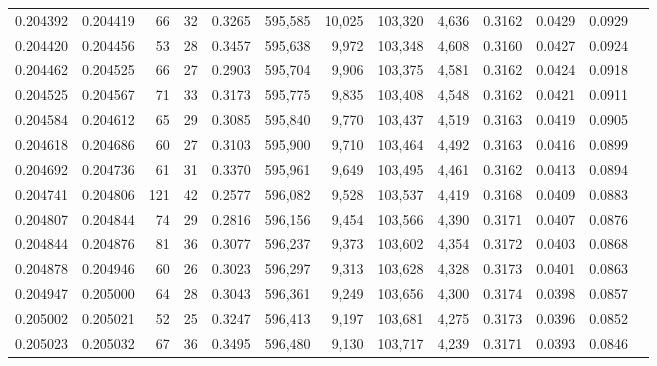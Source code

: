 \begin{tabular}{rrrrrrrrrrrrr}
0.204392 & 0.204419 &    66 &  32 &                                     0.3265 & 595,585 &  10,025 & 103,320 &   4,636 & 0.3162 & 0.0429 & 0.0929 \\
0.204420 & 0.204456 &    53 &  28 &                                     0.3457 & 595,638 &   9,972 & 103,348 &   4,608 & 0.3160 & 0.0427 & 0.0924 \\
0.204462 & 0.204525 &    66 &  27 &                                     0.2903 & 595,704 &   9,906 & 103,375 &   4,581 & 0.3162 & 0.0424 & 0.0918 \\
0.204525 & 0.204567 &    71 &  33 &                                     0.3173 & 595,775 &   9,835 & 103,408 &   4,548 & 0.3162 & 0.0421 & 0.0911 \\
0.204584 & 0.204612 &    65 &  29 &                                     0.3085 & 595,840 &   9,770 & 103,437 &   4,519 & 0.3163 & 0.0419 & 0.0905 \\
0.204618 & 0.204686 &    60 &  27 &                                     0.3103 & 595,900 &   9,710 & 103,464 &   4,492 & 0.3163 & 0.0416 & 0.0899 \\
0.204692 & 0.204736 &    61 &  31 &                                     0.3370 & 595,961 &   9,649 & 103,495 &   4,461 & 0.3162 & 0.0413 & 0.0894 \\
0.204741 & 0.204806 &   121 &  42 &                                     0.2577 & 596,082 &   9,528 & 103,537 &   4,419 & 0.3168 & 0.0409 & 0.0883 \\
0.204807 & 0.204844 &    74 &  29 &                                     0.2816 & 596,156 &   9,454 & 103,566 &   4,390 & 0.3171 & 0.0407 & 0.0876 \\
0.204844 & 0.204876 &    81 &  36 &                                     0.3077 & 596,237 &   9,373 & 103,602 &   4,354 & 0.3172 & 0.0403 & 0.0868 \\
0.204878 & 0.204946 &    60 &  26 &                                     0.3023 & 596,297 &   9,313 & 103,628 &   4,328 & 0.3173 & 0.0401 & 0.0863 \\
0.204947 & 0.205000 &    64 &  28 &                                     0.3043 & 596,361 &   9,249 & 103,656 &   4,300 & 0.3174 & 0.0398 & 0.0857 \\
0.205002 & 0.205021 &    52 &  25 &                                     0.3247 & 596,413 &   9,197 & 103,681 &   4,275 & 0.3173 & 0.0396 & 0.0852 \\
0.205023 & 0.205032 &    67 &  36 &                                     0.3495 & 596,480 &   9,130 & 103,717 &   4,239 & 0.3171 & 0.0393 & 0.0846 \\

\end{tabular}
